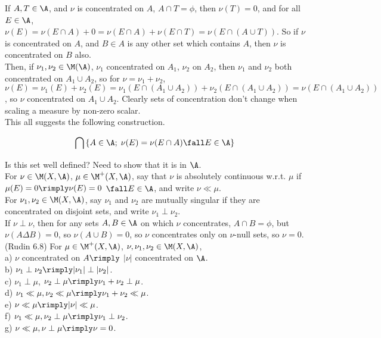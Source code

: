 \noindent
If $A,T \in \A$, and $\nu$ is concentrated on $A$, $A \cap T = \phi$, then $\nu(T) = 0$, and for all $E \in \A$, $\nu(E) = \nu(E \cap A) + 0 = \nu(E \cap A) + \nu(E \cap T) = \nu(E \cap (A \cup T))$. So if $\nu$ is concentrated on $A$, and $B \in A$ is any other set which contains $A$, then $\nu$ is concentrated on $B$ also. \\


\noindent
Then, if $\nu_1, \nu_2 \in \M(\A)$, $\nu_1$ concentrated on $A_1$, $\nu_2$ on $A_2$, then $\nu_1$ and $\nu_2$ both concentrated on $A_1 \cup A_2$, so for $\nu = \nu_1 + \nu_2$, $\nu(E) = \nu_1(E) + \nu_2(E) = \nu_1(E \cap (A_1 \cup A_2) ) + \nu_2(E \cap (A_1 \cup A_2) ) = \nu(E \cap (A_1 \cup A_2))$, so $\nu$ concentrated on $A_1\cup A_2$. Clearly sets of concentration don't change when scaling a measure by non-zero scalar. \\



\noindent
This all suggests the following construction.

$$
    \bigcap \left\{ A \in \A ; \; \nu(E) = \nu(E \cap A) \fall E \in \A  \right\}
$$

\noindent
Is this set well defined? Need to show that it is in $\A$. \\


For $\nu \in \M(X, \A)$, $\mu \in \M^+(X, \A)$, say that $\nu$ is absolutely continuous w.r.t. $\mu$ if $\mu(E) = 0 \rimply \nu(E) = 0$ $\fall E \in \A$, and write $\nu \ll \mu$. \\

For $\nu_1, \nu_2 \in \M(X, \A)$, say $\nu_1$ and $\nu_2$ are mutually singular if they are concentrated on disjoint sets, and write $\nu_1 \perp \nu_2$. \\

\noindent
If $\nu \perp \nu$, then for any sets $A,B \in \A$ on which $\nu$ concentrates, $A \cap B = \phi$, but $\nu(A \Delta B) = 0$, so $\nu(A \cup B) = 0$, so $\nu$ concentrates only on $\nu$-null sets, so $\nu=0$. \\


(Rudin 6.8) For $\mu \in \M^+(X, \A)$, $\nu,\nu_1,\nu_2 \in \M(X, \A)$, \\

\noindent
a) $\nu$ concentrated on $A \rimply$ $|\nu|$ concentrated on $\A$. \\
b) $\nu_1 \perp \nu_2 \rimply |\nu_1| \perp |\nu_2|$. \\
c) $\nu_1 \perp \mu$, $\nu_2 \perp \mu \rimply \nu_1 + \nu_2 \perp \mu$. \\
d) $\nu_1 \ll \mu, \nu_2 \ll \mu \rimply \nu_1 + \nu_2 \ll \mu$. \\
e) $\nu \ll \mu \rimply |\nu| \ll \mu$. \\
f) $\nu_1 \ll \mu, \nu_2 \perp \mu \rimply \nu_1 \perp \nu_2$. \\
g) $\nu \ll \mu, \nu \perp \mu \rimply \nu = 0$. \\

